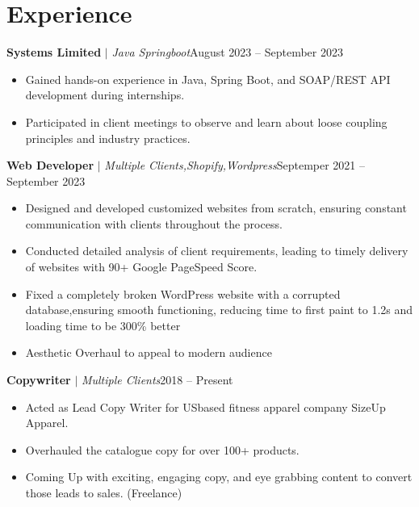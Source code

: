 \section{Experience}
  \resumeSubHeadingListStart

          \resumeProjectHeading
          {\textbf{Systems Limited} $|$ \footnotesize\emph{Java Springboot}\vspace{8pt}}{August 2023 -- September 2023}
            \begin{itemize}
                \item Gained hands-on experience in Java, Spring Boot, and SOAP/REST API development during internships.
                \item 
                Participated in client meetings to observe and learn about loose coupling principles and industry practices.
            \end{itemize}
          
          \resumeProjectHeading
          {\textbf{Web Developer}\vspace{8pt} $|$ \footnotesize\emph{Multiple Clients,Shopify,Wordpress}}{Septemper 2021 -- September 2023}
            \begin{itemize}
              \item 
              Designed and developed customized websites from scratch, ensuring constant communication with clients throughout the process.
              \item 
              Conducted detailed analysis of client requirements, leading to timely delivery of websites with 90+ Google PageSpeed Score.  
              \item 
               Fixed a completely broken WordPress website with a corrupted database,ensuring smooth functioning, reducing time to first paint to 1.2s and loading time to be 300\% better
              \item 
              Aesthetic Overhaul to appeal to modern audience
          \end{itemize}

          \resumeProjectHeading
          {\textbf{Copywriter} $|$ \footnotesize\emph{Multiple Clients}\vspace{8pt}}{2018 -- Present}
          {\small{}}
          \begin{itemize}
              \item
              Acted as Lead Copy Writer for USbased fitness apparel company SizeUp Apparel.
              \item 
              Overhauled the catalogue copy for over 100+ products.
              \item
               Coming Up with exciting, engaging copy, and eye grabbing content to convert those leads to sales. (Freelance)
              
              
          \end{itemize}

    \resumeSubHeadingListEnd 